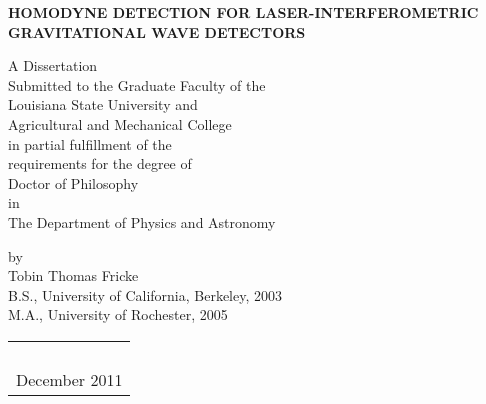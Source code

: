 \thispagestyle{empty}
\begin{center}
\textbf{HOMODYNE DETECTION FOR LASER-INTERFEROMETRIC GRAVITATIONAL WAVE DETECTORS}
\vspace{1.75in}

A Dissertation\\
\vspace{1ex}
Submitted to the Graduate Faculty of the\\
Louisiana State University and\\
Agricultural and Mechanical College\\
in partial fulfillment of the\\
requirements for the degree of\\
Doctor of Philosophy\\
\vspace{1ex}
in\\
\vspace{1ex}
The Department of Physics and Astronomy\\
\vspace{1in}
\vspace{0.75in}

by\\
Tobin Thomas Fricke \\
B.S., University of California, Berkeley, 2003\\
M.A., University of Rochester, 2005 \\

\begin{tabular}{c}
\\
\\
\\
\\
\\
December 2011
\end{tabular}

\end{center}

